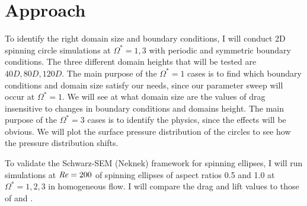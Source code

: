 \chapter{Approach}
\label{chp:3_Approach}
To identify the right domain size and boundary conditions, I will conduct 2D spinning circle simulations at $\Omega^{\ast} = 1, 3$ with periodic and symmetric boundary conditions. The three different domain heights that will be tested are $40D, 80D, 120D$. The main purpose of the $\Omega^{\ast}=1$ cases is to find which boundary conditions and domain size satisfy our needs, since our parameter sweep will occur at $\Omega^{\ast}=1$. We will see at what domain size are the values of drag insensitive to changes in boundary conditions and domains height. The main purpose of the $\Omega^{\ast}=3$ cases is to identify the physics, since the effects will be obvious. We will plot the surface pressure distribution of the circles to see how the pressure distribution shifts. 

To validate the Schwarz-SEM (Neknek) framework for spinning ellipses, I will run simulations at $\mathit{Re} = 200$ of spinning ellipses of aspect ratios 0.5 and 1.0 at $\Omega^{\ast} = 1,2,3$ in homogeneous flow. I will compare the drag and lift values to those of \cite{lu_flow_2018} and \cite{lua_rotating_2018}.



